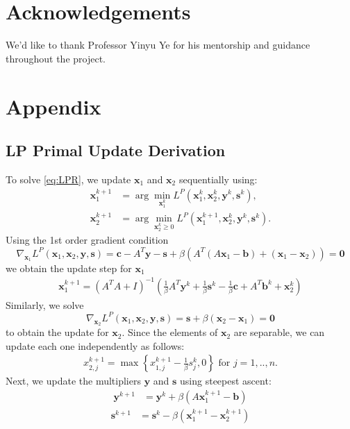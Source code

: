 \documentclass{article}
\begin{document}
\section{Acknowledgements}

We'd like to thank Professor Yinyu Ye for his mentorship and guidance throughout the project. 

\section{Appendix}

\subsection*{LP Primal Update Derivation}
To solve \eqref{eq:LPR}, we update $\mathbf{x}_{1}$ and $\mathbf{x}_{2}$ sequentially using:
\begin{align}
\mathbf{x}_{1}^{k+1} & = \arg \min_{\mathbf{x}_{1}^{k}} L^{P}(\mathbf{x}_{1}^{k},\mathbf{x}_{2}^{k},\mathbf{y}^{k},\mathbf{s}^k),\\
\mathbf{x}_{2}^{k+1} & = \arg \min_{\mathbf{x}_{2}^{k} \geq 0} L^{P}(\mathbf{x}_{1}^{k+1},\mathbf{x}_{2}^{k},\mathbf{y}^{k},\mathbf{s}^k).
\end{align}
Using the 1st order gradient condition
\[
\nabla_{\mathbf{x}_{1}}L^{P}(\mathbf{x}_{1},\mathbf{x}_{2},\mathbf{y}, \mathbf{s})=\mathbf{c}-A^{T}\mathbf{y}-\mathbf{s}+\beta\left(A^{T}\left(A\mathbf{x}_{1}-\mathbf{b}\right)+\left(\mathbf{x}_{1}-\mathbf{x}_{2}\right)\right) = \mathbf{0}
\]
we obtain the update step for $\mathbf{x}_{1}$
\begin{align}\label{eq:x1_primal_update}
\mathbf{x}_{1}^{k+1} = \left(A^{T}A+I\right)^{-1}\left(\frac{1}{\beta}A^{T}\mathbf{y}^k+\frac{1}{\beta}\mathbf{s}^k-\frac{1}{\beta}\mathbf{c}+A^{T}\mathbf{b}^k+\mathbf{x}_{2}^k\right)
\end{align}
Similarly, we solve
\[
\nabla_{\mathbf{x}_{2}}L^{P}(\mathbf{x}_{1},\mathbf{x}_{2},\mathbf{y}, \mathbf{s})=\mathbf{s}+\beta\left(\mathbf{x}_{2}-\mathbf{x}_{1}\right) = \mathbf{0}
\]
to obtain the update for $\mathbf{x}_{2}$. Since the elements of $\mathbf{x}_{2}$ are separable, we can update each one independently as follows:
\begin{align}
{x}_{2,j}^{k+1} = \max\left\{ {x}_{1,j}^{k+1}-\frac{1}{\beta}{s}_j^k,0\right\} \text{ for $j = 1,..,n$}.
\end{align}
Next, we update the multipliers $\mathbf{y}$ and $\mathbf{s}$ using steepest ascent:
\begin{align}\label{eq:y_primal_update}
\mathbf{y}^{k+1} &= \mathbf{y}^{k} + \beta (A \mathbf{x}_1^{k+1}  - \mathbf{b}) 
\end{align}
\begin{align}\label{eq:s_primal_update}
\mathbf{s}^{k+1} &= \mathbf{s}^{k}  - \beta  (\mathbf{x}_1^{k+1}  -\mathbf{x}_2^{k+1} )
\end{align}
\end{document}
